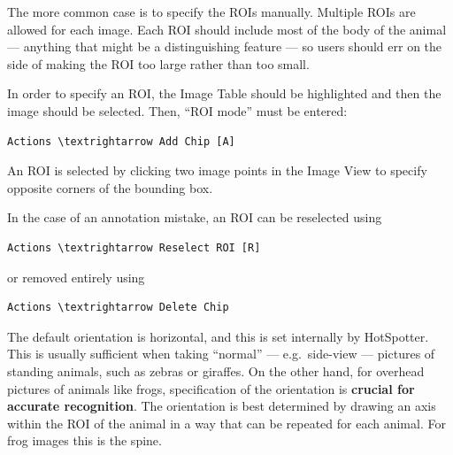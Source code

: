 \documentclass[a4paper,10pt]{article}
\begin{document}
        The more common case is to specify the ROIs manually.  Multiple ROIs are allowed for each
        image.  Each ROI should include most of the body of the animal ---
        anything that might be a distinguishing feature --- so users should err on the
        side of making the ROI too large rather than too small.

        In order to specify an ROI, the Image Table should be
        highlighted and then the image should be selected.  Then,
        ``ROI mode'' must be entered:
        \begin{Verbatim}[commandchars=\\\{\}]
        Actions \textrightarrow Add Chip [A]
        \end{Verbatim}
        An ROI is selected by clicking two image points in the Image View to specify opposite corners of the
        bounding box.

        \;

        In the case of an annotation mistake, an ROI can be reselected using 
        \begin{Verbatim}[commandchars=\\\{\}]
        Actions \textrightarrow Reselect ROI [R]
        \end{Verbatim}
        or removed entirely using 
        \begin{Verbatim}[commandchars=\\\{\}]
        Actions \textrightarrow Delete Chip
        \end{Verbatim}

        The default orientation is horizontal, and this is set
        internally by HotSpotter.  This is usually sufficient when
        taking ``normal'' --- e.g.\ side-view --- pictures of standing
        animals, such as zebras or giraffes.  On the other hand, for overhead
        pictures of animals like frogs, specification of the
        orientation is \textbf{crucial for accurate recognition}.  The
        orientation is best determined by drawing an axis within the
        ROI of the animal in a way that can be repeated for each
        animal.  For frog images this is the spine.
\end{document}
